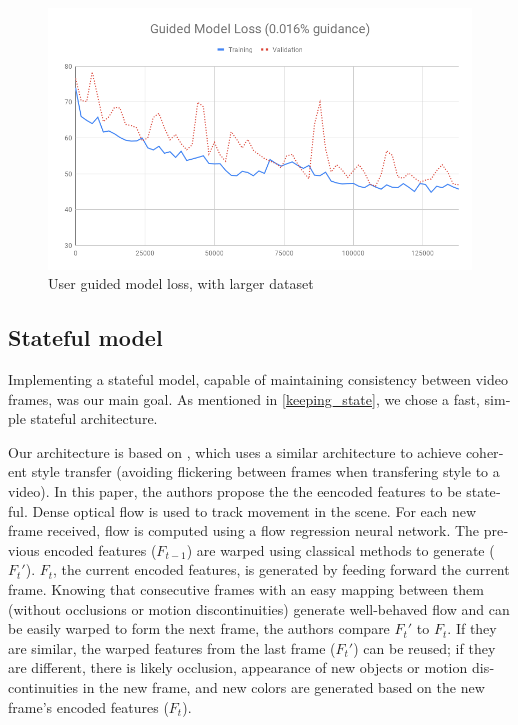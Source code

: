 \documentclass[12pt,openright,oneside,a4paper,english]{abntex2}
\begin{document}
\begin{otherlanguage}{english}
\begin{figure}[!htb]
\centering
\includegraphics[width=\textwidth]{loss/Guided_0_016}
\caption{User guided model loss, with larger dataset}
\label{loss_0_016}
\end{figure}

\subsection{Stateful model}

Implementing a stateful model, capable of maintaining consistency between video frames, was our main goal. As mentioned in \ref{keeping_state}, we chose a fast, simple stateful architecture.

Our architecture is based on , %
which uses a similar architecture to achieve coherent style transfer (avoiding flickering between frames when transfering style to a video). In this paper, the authors propose the the eencoded features to be stateful. Dense optical flow is used to track movement in the scene. For each new frame received, flow is computed using a flow regression neural network. The previous encoded features ($F_{t-1}$) are warped using classical methods to generate ($F_t'$). $F_t$, the current encoded features, is generated by feeding forward the current frame. Knowing that consecutive frames with an easy mapping between them (without occlusions or motion discontinuities) generate well-behaved flow and can be easily warped to form the next frame, the authors compare $F_t'$ to $F_t$. If they are similar, the warped features from the last frame ($F_t'$) can be reused; if they are different, there is likely occlusion, appearance of new objects or motion discontinuities in the new frame, and new colors are generated based on the new frame's encoded features ($F_t$).


\end{otherlanguage}
\end{document}
